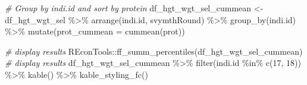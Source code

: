\documentclass[
]{book}
\newenvironment{Shaded}{\begin{snugshade}}{\end{snugshade}}
\newcommand{\AttributeTok}[1]{\textcolor[rgb]{0.77,0.63,0.00}{#1}}
\newcommand{\CommentTok}[1]{\textcolor[rgb]{0.56,0.35,0.01}{\textit{#1}}}
\newcommand{\DecValTok}[1]{\textcolor[rgb]{0.00,0.00,0.81}{#1}}
\newcommand{\FunctionTok}[1]{\textcolor[rgb]{0.00,0.00,0.00}{#1}}
\newcommand{\NormalTok}[1]{#1}
\newcommand{\OtherTok}[1]{\textcolor[rgb]{0.56,0.35,0.01}{#1}}
\newcommand{\SpecialCharTok}[1]{\textcolor[rgb]{0.00,0.00,0.00}{#1}}
\begin{document}
\begin{Shaded}
\begin{Highlighting}[]
\CommentTok{\# Group by indi.id and sort by protein}
\NormalTok{df\_hgt\_wgt\_sel\_cummean }\OtherTok{\textless{}{-}}\NormalTok{ df\_hgt\_wgt\_sel }\SpecialCharTok{\%\textgreater{}\%}
  \FunctionTok{arrange}\NormalTok{(indi.id, svymthRound) }\SpecialCharTok{\%\textgreater{}\%}
  \FunctionTok{group\_by}\NormalTok{(indi.id) }\SpecialCharTok{\%\textgreater{}\%}
  \FunctionTok{mutate}\NormalTok{(}\AttributeTok{prot\_cummean =} \FunctionTok{cummean}\NormalTok{(prot))}

\CommentTok{\# display results}
\NormalTok{REconTools}\SpecialCharTok{::}\FunctionTok{ff\_summ\_percentiles}\NormalTok{(df\_hgt\_wgt\_sel\_cummean)}
\CommentTok{\# display results}
\NormalTok{df\_hgt\_wgt\_sel\_cummean }\SpecialCharTok{\%\textgreater{}\%} \FunctionTok{filter}\NormalTok{(indi.id }\SpecialCharTok{\%in\%} \FunctionTok{c}\NormalTok{(}\DecValTok{17}\NormalTok{, }\DecValTok{18}\NormalTok{)) }\SpecialCharTok{\%\textgreater{}\%} 
  \FunctionTok{kable}\NormalTok{() }\SpecialCharTok{\%\textgreater{}\%} \FunctionTok{kable\_styling\_fc}\NormalTok{()}
\end{Highlighting}
\end{Shaded}
\end{document}
